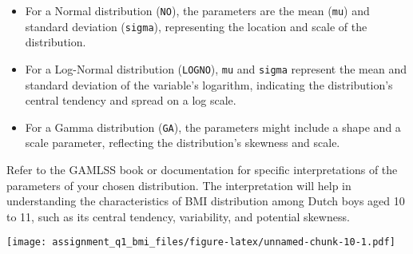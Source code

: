 \begin{itemize}
\item
  For a Normal distribution (\texttt{NO}), the parameters are the mean
  (\texttt{mu}) and standard deviation (\texttt{sigma}), representing
  the location and scale of the distribution.
\item
  For a Log-Normal distribution (\texttt{LOGNO}), \texttt{mu} and
  \texttt{sigma} represent the mean and standard deviation of the
  variable's logarithm, indicating the distribution's central tendency
  and spread on a log scale.
\item
  For a Gamma distribution (\texttt{GA}), the parameters might include a
  shape and a scale parameter, reflecting the distribution's skewness
  and scale.
\end{itemize}

Refer to the GAMLSS book or documentation for specific interpretations
of the parameters of your chosen distribution. The interpretation will
help in understanding the characteristics of BMI distribution among
Dutch boys aged 10 to 11, such as its central tendency, variability, and
potential skewness.

\begin{Shaded}
\begin{Highlighting}[]
\OtherTok{\textless{}{-}} 
  \SpecialCharTok{$}\SpecialCharTok{$}\SpecialCharTok{$}\SpecialCharTok{$}
\NormalTok{\}}

\OtherTok{\textless{}{-}} \NormalTok{(}\SpecialCharTok{+}
  \NormalTok{(}\NormalTok{(} \NormalTok{, }\NormalTok{, }\NormalTok{) }

\OtherTok{\textless{}{-}}\SpecialCharTok{+} \NormalTok{(}\NormalTok{, }\NormalTok{)}
\end{Highlighting}
\end{Shaded}

\texttt{[image: assignment\_q1\_bmi\_files/figure-latex/unnamed-chunk-10-1.pdf]}
